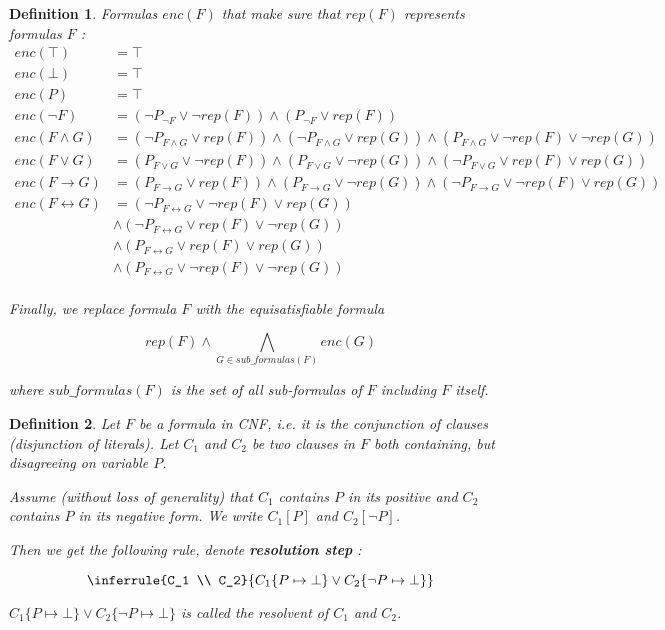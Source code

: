 \documentclass[a4paper,11pt]{report}
\newtheorem*{mydef}{Definition}
\begin{document}
\begin{mydef}
  Formulas $enc(F)$ that make sure that $rep(F)$ represents formulas $F$ :
  \begin{align*}
    enc(\top) &= \top\\
    enc(\bot) &= \top\\
    enc(P) &= \top\\
    enc(\neg F) &= (\neg P_{\neg F} \vee \neg rep(F)) \wedge (P_{\neg F} \vee rep(F))\\
    enc(F \wedge G) &= (\neg P_{F \wedge G} \vee rep(F)) \wedge (\neg P_{F \wedge G} \vee rep(G)) \wedge (P_{F \wedge G} \vee \neg rep(F) \vee \neg rep(G)) \\
    enc(F \vee G) &= (P_{F \vee G} \vee \neg rep(F)) \wedge (P_{F \vee G} \vee \neg rep(G)) \wedge (\neg P_{F \vee G} \vee rep(F) \vee rep(G))\\
    enc(F \to G) &= (P_{F \to G} \vee rep(F)) \wedge (P_{F \to G} \vee \neg rep(G)) \wedge (\neg P_{F \to G} \vee \neg rep(F) \vee rep(G))\\
    enc(F \leftrightarrow G) &= (\neg P_{F \leftrightarrow G} \vee \neg rep(F) \vee rep(G)) \\
              & \wedge (\neg P_{F \leftrightarrow G} \vee rep(F) \vee \neg rep(G)) \\
              & \wedge (P_{F \leftrightarrow G} \vee rep(F) \vee rep(G)) \\
              & \wedge (P_{F \leftrightarrow G} \vee \neg rep(F) \vee \neg rep(G)) \\
  \end{align*}

  Finally, we replace formula $F$ with the equisatisfiable formula

  \[
    rep(F) \wedge \bigwedge_{G \in sub\_formulas(F)} enc(G)
  \]

  where $sub\_formulas(F)$ is the set of all sub-formulas of $F$ including $F$ itself.
\end{mydef}

\begin{mydef}
  Let $F$ be a formula in CNF, i.e. it is the conjunction of clauses
  (disjunction of literals). Let $C_1$ and $C_2$ be two clauses in $F$ both
  containing, but disagreeing on variable $P$.

  Assume (without loss of generality) that $C_1$ contains $P$ in its positive
  and $C_2$ contains $P$ in its negative form. We write $C_1[P]$ and $C_2[\neg
  P]$.

  Then we get the following rule, denote \textbf{resolution step} :

  \[
    \inferrule {C_1 \\ C_2} {C_1\{P \mapsto \bot\} \vee C_2\{\neg P \mapsto \bot\}}
  \]

  $C_1\{P \mapsto \bot\} \vee C_2\{\neg P \mapsto \bot\}$ is called the
  resolvent of $C_1$ and $C_2$.
\end{mydef}
\end{document}
